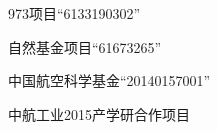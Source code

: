 
\begin{projects}{99}
    \item 973项目“6133190302”
    \item 自然基金项目“61673265”
    \item 中国航空科学基金“20140157001”
    \item 中航工业2015产学研合作项目
\end{projects}
